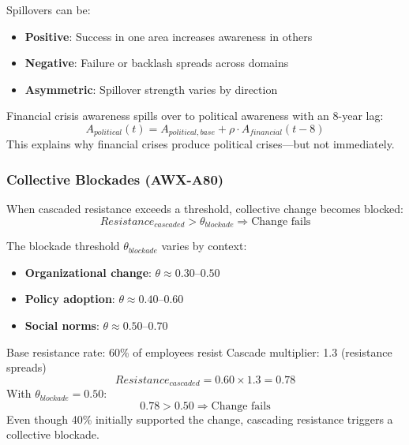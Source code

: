 Spillovers can be:
\begin{itemize}
    \item \textbf{Positive}: Success in one area increases awareness in others
    \item \textbf{Negative}: Failure or backlash spreads across domains
    \item \textbf{Asymmetric}: Spillover strength varies by direction
\end{itemize}

\begin{example}
Financial crisis awareness spills over to political awareness with an 
8-year lag:
\[
A_{political}(t) = A_{political,base} + \rho \cdot A_{financial}(t - 8)
\]
This explains why financial crises produce political crises—but not 
immediately.
\end{example}

\subsubsection{Collective Blockades (AWX-A80)}

\begin{axiom}
When cascaded resistance exceeds a threshold, collective change becomes 
blocked:
\begin{equation}
Resistance_{cascaded} > \theta_{blockade} \Rightarrow \text{Change fails}
\end{equation}
\end{axiom}

The blockade threshold $\theta_{blockade}$ varies by context:
\begin{itemize}
    \item \textbf{Organizational change}: $\theta \approx 0.30$--$0.50$
    \item \textbf{Policy adoption}: $\theta \approx 0.40$--$0.60$
    \item \textbf{Social norms}: $\theta \approx 0.50$--$0.70$
\end{itemize}

\begin{example}
Base resistance rate: 60\% of employees resist
Cascade multiplier: 1.3 (resistance spreads)
\[
Resistance_{cascaded} = 0.60 \times 1.3 = 0.78
\]
With $\theta_{blockade} = 0.50$:
\[
0.78 > 0.50 \Rightarrow \text{Change fails}
\]
Even though 40\% initially supported the change, cascading resistance 
triggers a collective blockade.
\end{example}

